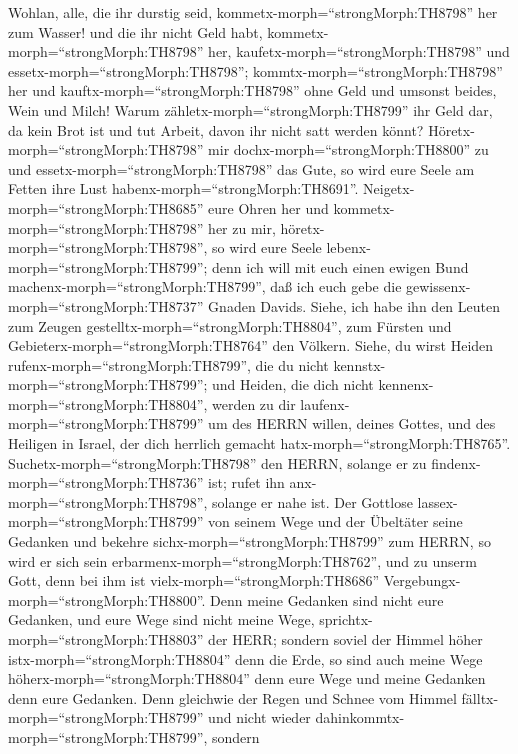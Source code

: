 Wohlan, alle, die ihr durstig seid,
kommetx-morph=``strongMorph:TH8798'' her zum Wasser! und die ihr nicht
Geld habt, kommetx-morph=``strongMorph:TH8798'' her,
kaufetx-morph=``strongMorph:TH8798'' und
essetx-morph=``strongMorph:TH8798''; kommtx-morph=``strongMorph:TH8798''
her und kauftx-morph=``strongMorph:TH8798'' ohne Geld und umsonst
beides, Wein und Milch!  Warum
zähletx-morph=``strongMorph:TH8799'' ihr Geld dar, da kein Brot ist und
tut Arbeit, davon ihr nicht satt werden könnt?
Höretx-morph=``strongMorph:TH8798'' mir
dochx-morph=``strongMorph:TH8800'' zu und
essetx-morph=``strongMorph:TH8798'' das Gute, so wird eure Seele am
Fetten ihre Lust habenx-morph=``strongMorph:TH8691''. 
Neigetx-morph=``strongMorph:TH8685'' eure Ohren her und
kommetx-morph=``strongMorph:TH8798'' her zu mir,
höretx-morph=``strongMorph:TH8798'', so wird eure Seele
lebenx-morph=``strongMorph:TH8799''; denn ich will mit euch einen ewigen
Bund machenx-morph=``strongMorph:TH8799'', daß ich euch gebe die
gewissenx-morph=``strongMorph:TH8737'' Gnaden Davids. 
Siehe, ich habe ihn den Leuten zum Zeugen
gestelltx-morph=``strongMorph:TH8804'', zum Fürsten und
Gebieterx-morph=``strongMorph:TH8764'' den Völkern.  Siehe,
du wirst Heiden rufenx-morph=``strongMorph:TH8799'', die du nicht
kennstx-morph=``strongMorph:TH8799''; und Heiden, die dich nicht
kennenx-morph=``strongMorph:TH8804'', werden zu dir
laufenx-morph=``strongMorph:TH8799'' um des HERRN willen, deines Gottes,
und des Heiligen in Israel, der dich herrlich gemacht
hatx-morph=``strongMorph:TH8765''. 
Suchetx-morph=``strongMorph:TH8798'' den HERRN, solange er zu
findenx-morph=``strongMorph:TH8736'' ist; rufet ihn
anx-morph=``strongMorph:TH8798'', solange er nahe ist.  Der
Gottlose lassex-morph=``strongMorph:TH8799'' von seinem Wege und der
Übeltäter seine Gedanken und bekehre sichx-morph=``strongMorph:TH8799''
zum HERRN, so wird er sich sein erbarmenx-morph=``strongMorph:TH8762'',
und zu unserm Gott, denn bei ihm ist vielx-morph=``strongMorph:TH8686''
Vergebungx-morph=``strongMorph:TH8800''.  Denn meine
Gedanken sind nicht eure Gedanken, und eure Wege sind nicht meine Wege,
sprichtx-morph=``strongMorph:TH8803'' der HERR;  sondern
soviel der Himmel höher istx-morph=``strongMorph:TH8804'' denn die Erde,
so sind auch meine Wege höherx-morph=``strongMorph:TH8804'' denn eure
Wege und meine Gedanken denn eure Gedanken.  Denn gleichwie
der Regen und Schnee vom Himmel fälltx-morph=``strongMorph:TH8799'' und
nicht wieder dahinkommtx-morph=``strongMorph:TH8799'', sondern
